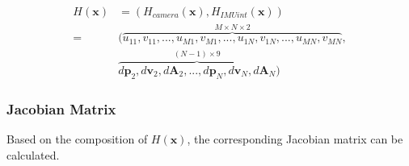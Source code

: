 \documentclass[12pt]{article}   %
\begin{document}
\begin{align} %
H(\textbf{x}) &= (H_{camera}(\textbf{x}), H_{IMUint}(\textbf{x})) \nonumber \\
	=& (\overbrace{{u}_{11}, {v}_{11}, ... , {u}_{M1}, {v}_{M1}, ..., {u}_{1N}, {v}_{1N}, ... , {u}_{MN}, {v}_{MN}}^{M \times N \times 2}, \nonumber \nonumber \\ 
	& \overbrace{d\textbf{p}_{2}, d\textbf{v}_{2}, d\textbf{A}_{2}, ... , d\textbf{p}_{N}, d\textbf{v}_{N}, d\textbf{A}_{N}}^{(N-1) \times 9}) 
\end{align}


\subsubsection{Jacobian Matrix}

Based on the composition of $H(\textbf{x})$, the corresponding Jacobian matrix can be calculated. 
\end{document}
